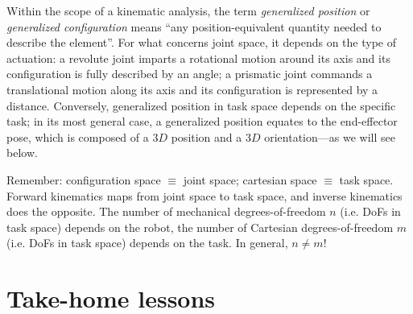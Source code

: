 Within the scope of a kinematic analysis, the term \textsl{generalized position} or \textsl{generalized configuration} means ``any position-equivalent quantity needed to describe the element''.
For what concerns joint space, it depends on the type of actuation: a revolute joint imparts a rotational motion around its axis and its configuration is fully described by an angle; a prismatic joint commands a translational motion along its axis and its configuration is represented by a distance.
Conversely, generalized position in task space depends on the specific task; in its most general case, a generalized position equates to the end-effector pose, which is composed of a $3D$ position and a $3D$ orientation---as we will see below.

\begin{mdframed}
\noindent Remember:
configuration space $\equiv$ joint space;
cartesian space $\equiv$ task space.
Forward kinematics maps from joint space to task space, and inverse kinematics does the opposite.
The number of mechanical degrees-of-freedom $n$ (i.e. DoFs in task space) depends on the robot, the number of Cartesian degrees-of-freedom $m$ (i.e. DoFs in task space) depends on the task. In general, $n \neq m$!
\end{mdframed}








\section*{Take-home lessons}

